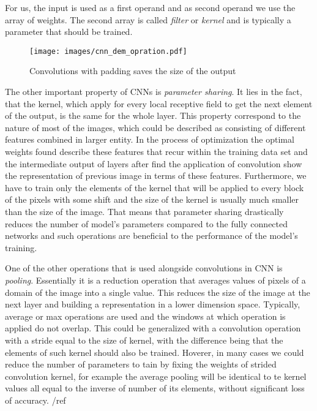For us, the input is used as a first operand and as second operand we use the array of weights.
The second array is called \textit{filter} or \textit{kernel} and is typically a parameter that should be trained. 
\begin{figure}
	\centering
	\texttt{[image: images/cnn\_dem\_opration.pdf]}
	\caption{Convolutions with padding saves the size of the output}
	\label{fig:convoper_demo}
	\end{figure}
\medskip

The other important property of CNNs is \textit{parameter sharing}. 
It lies in the fact, that the kernel, which apply for every local receptive field to get the next element of the output, is the same for the whole layer. 
This property correspond to the nature of most of the images, which could be described as consisting of different features combined in larger entity.
In the process of optimization the optimal weights found describe these features that recur within the training data set and the intermediate output of layers after find the application of convolution show the representation of previous image in terms of these features.
Furthermore, we have to train only the elements of the kernel that will be applied to every block of the pixels with some shift and the size of the kernel is usually much smaller than the size of the image.
That means that parameter sharing drastically reduces the number of model's parameters compared to the fully connected networks and such operations are beneficial to the performance of the model's training.
\medskip

One of the other operations that is used alongside convolutions in CNN is \textit{pooling}.
Essentially it is a reduction operation that averages values of pixels of a domain of the image into a single value.
This reduces the size of the image at the next layer and building a representation in a lower dimension space. 
Typically, average or max operations are used and the windows at which operation is applied do not overlap.
This could be generalized with a convolution operation with a stride equal to the size of kernel, with the difference being that the elements of such kernel should also be trained.
Hoverer, in many cases we could reduce the number of parameters to tain by fixing the weights of strided convolution kernel, for example the average pooling will be identical to te kernel values all equal to the inverse of number of its elements, without significant loss of accuracy. /ref{}
\medskip

